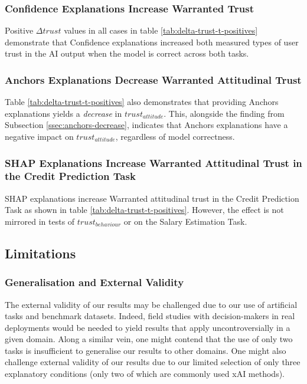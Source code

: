 \subsubsection{Confidence Explanations Increase Warranted Trust}
Positive $\Delta trust$ values in all cases in table \ref{tab:delta-trust-t-positives} demonstrate that Confidence explanations increased both measured types of user trust in the AI output when the model is correct across both tasks.

\subsubsection{Anchors Explanations Decrease Warranted Attitudinal Trust}
Table \ref{tab:delta-trust-t-positives} also demonstrates that providing Anchors explanations yields a \emph{decrease} in $trust_{attitude}$. This, alongside the finding from Subsection \ref{ssec:anchors-decrease}, indicates that Anchors explanations have a negative impact on $trust_{attitude}$, regardless of model correctness.

\subsubsection{SHAP Explanations Increase Warranted Attitudinal Trust in the Credit Prediction Task}
SHAP explanations increase Warranted attitudinal trust in the Credit Prediction Task as shown in table \ref{tab:delta-trust-t-positives}. However, the effect is not mirrored in tests of $trust_{behaviour}$ or on the Salary Estimation Task.

\subsection{Limitations}

\subsubsection{Generalisation and External Validity}
The external validity of our results may be challenged due to our use of artificial tasks and benchmark datasets. Indeed, field studies with decision-makers in real deployments would be needed to yield results that apply uncontroversially in a given domain. Along a similar vein, one might contend that the use of only two tasks is insufficient to generalise our results to other domains. One might also challenge external validity of our results due to our limited selection of only three explanatory conditions (only two of which are commonly used xAI methods).

